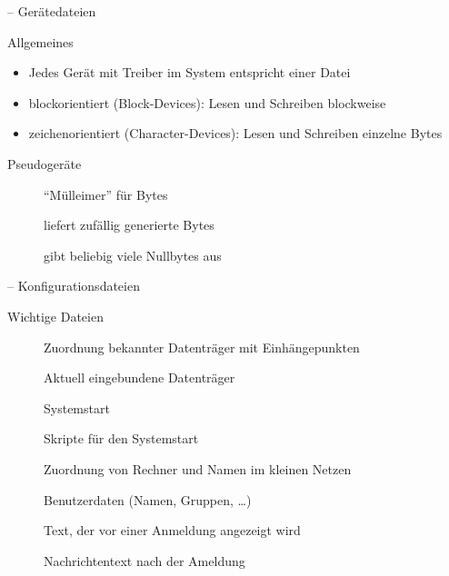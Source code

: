 \documentclass[aspectratio=43]{beamer}
\begin{document}
\begin{frame}{ -- Gerätedateien}
  \begin{block}{Allgemeines}
    \begin{itemize}
     \item Jedes Gerät mit Treiber im System entspricht einer Datei
     \item blockorientiert (Block-Devices): Lesen und Schreiben blockweise
     \item zeichenorientiert (Character-Devices): Lesen und Schreiben einzelne Bytes
    \end{itemize}
  \end{block}
  \begin{block}{Pseudogeräte}
    \begin{description}
      \item[] "`Mülleimer"' für Bytes
      \item[] liefert zufällig generierte Bytes
      \item[] gibt beliebig viele Nullbytes aus
    \end{description}
  \end{block}
\end{frame}

\begin{frame}{ -- Konfigurationsdateien}
%     
  \begin{block}{Wichtige Dateien}
    \begin{description}
      \item[] Zuordnung bekannter Datenträger mit Einhängepunkten
      \item[] Aktuell eingebundene Datenträger
      \item[] Systemstart
      \item[] Skripte für den Systemstart
      \item[] Zuordnung von Rechner und Namen im kleinen Netzen
      \item[] Benutzerdaten (Namen, Gruppen, \dots)
      \item[] Text, der vor einer Anmeldung angezeigt wird
      \item[] Nachrichtentext nach der Ameldung
    \end{description}
  \end{block}
\end{frame}
\end{document}
